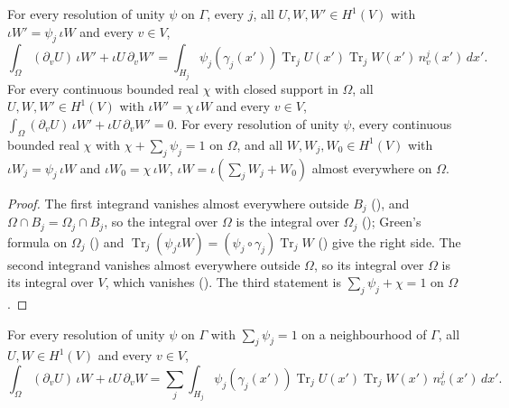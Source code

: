 \begin{lemma}
\label{lem:green-pieces}
\leanok
{}
For every resolution of unity $\psi$ on $\Gamma$, every $j$, all $U, W, W' \in H^1(V)$ with
$\iota W' = \psi_j \, \iota W$ and every $v \in V$,
\[
  \int_\Omega (\partial_v U) \, \iota W' + \iota U \, \partial_v W'
  = \int_{H_j} \psi_j(\gamma_j(x')) \operatorname{Tr}_j U(x') \operatorname{Tr}_j W(x') \,
    n^j_v(x') \, dx' .
\]
For every continuous bounded real $\chi$ with closed support in $\Omega$, all
$U, W, W' \in H^1(V)$ with $\iota W' = \chi \, \iota W$ and every $v \in V$,
$\int_\Omega (\partial_v U) \, \iota W' + \iota U \, \partial_v W' = 0$. For every resolution of
unity $\psi$, every continuous bounded real $\chi$ with $\chi + \sum_j \psi_j = 1$ on $\Omega$, and
all $W, W_j, W_0 \in H^1(V)$ with $\iota W_j = \psi_j \, \iota W$ and $\iota W_0 = \chi \, \iota W$,
$\iota W = \iota (\sum_j W_j + W_0)$ almost everywhere on $\Omega$.
\end{lemma}

\begin{proof}
\leanok
The first integrand vanishes almost everywhere outside $B_j$ (),
and $\Omega \cap B_j = \Omega_j \cap B_j$, so the integral over $\Omega$ is the integral over
$\Omega_j$ (); Green's formula on $\Omega_j$
() and $\operatorname{Tr}_j (\psi_j \iota W) = (\psi_j \circ \gamma_j)
\operatorname{Tr}_j W$ () give the right side. The second integrand
vanishes almost everywhere outside $\Omega$, so its integral over $\Omega$ is its integral over
$V$, which vanishes (). The third statement is
$\sum_j \psi_j + \chi = 1$ on $\Omega$.
\end{proof}

\begin{theorem}
\label{thm:domain-green-charts-nhds}
\leanok
{}
For every resolution of unity $\psi$ on $\Gamma$ with $\sum_j \psi_j = 1$ on a neighbourhood of
$\Gamma$, all $U, W \in H^1(V)$ and every $v \in V$,
\[
  \int_\Omega (\partial_v U) \, \iota W + \iota U \, \partial_v W
  = \sum_j \int_{H_j} \psi_j(\gamma_j(x')) \operatorname{Tr}_j U(x') \operatorname{Tr}_j W(x') \,
    n^j_v(x') \, dx' .
\]
\end{theorem}

